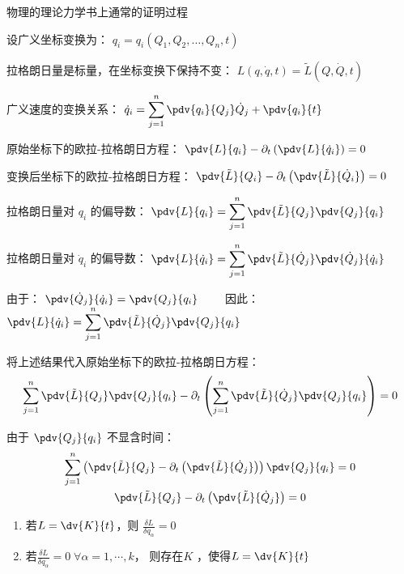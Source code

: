 \documentclass[12pt, a4paper, oneside, UTF8]{ctexbook}  %
\begin{document}
\begin{add}
    物理的理论力学书上通常的证明过程

    设广义坐标变换为：
    \(\displaystyle q_i = q_i(Q_1, Q_2, \dots, Q_n, t) \)
    
    拉格朗日量是标量，在坐标变换下保持不变：
    \(\displaystyle L(q, \dot{q}, t) = \tilde{L}(Q, \dot{Q}, t) \)
    
    广义速度的变换关系：
    \(\displaystyle \dot{q}_i = \sum_{j=1}^n \pdv{q_i}{Q_j} \dot{Q}_j + \pdv{q_i}{t} \)
    
    原始坐标下的欧拉-拉格朗日方程：
    \(\displaystyle \pdv{L}{q_i} - \partial_t \left( \pdv{L}{\dot{q}_i} \right) = 0 \)
    
    变换后坐标下的欧拉-拉格朗日方程：
    \(\displaystyle \pdv{\tilde{L}}{Q_i} - \partial_t \left( \pdv{\tilde{L}}{\dot{Q}_i} \right) = 0 \)
    
    拉格朗日量对 \( q_i \) 的偏导数：
    \(\displaystyle \pdv{L}{q_i} = \sum_{j=1}^n \pdv{\tilde{L}}{Q_j} \pdv{Q_j}{q_i} \)
    
    拉格朗日量对 \(\dot{q}_i\) 的偏导数：
    \(\displaystyle \pdv{L}{\dot{q}_i} = \sum_{j=1}^n \pdv{\tilde{L}}{\dot{Q}_j} \pdv{\dot{Q}_j}{\dot{q}_i} \)

    由于：
    \(\displaystyle \pdv{\dot{Q}_j}{\dot{q}_i} = \pdv{Q_j}{q_i}\qquad \)
    因此：
    \(\displaystyle \pdv{L}{\dot{q}_i} = \sum_{j=1}^n \pdv{\tilde{L}}{\dot{Q}_j} \pdv{Q_j}{q_i} \)

将上述结果代入原始坐标下的欧拉-拉格朗日方程：
\[
\sum_{j=1}^n \pdv{\tilde{L}}{Q_j} \pdv{Q_j}{q_i} - \partial_t \left( \sum_{j=1}^n \pdv{\tilde{L}}{\dot{Q}_j} \pdv{Q_j}{q_i} \right) = 0
\]

由于 \(\pdv{Q_j}{q_i}\) 不显含时间：
\begin{gather*}
\sum_{j=1}^n \left( \pdv{\tilde{L}}{Q_j} - \partial_t \left( \pdv{\tilde{L}}{\dot{Q}_j} \right) \right) \pdv{Q_j}{q_i} = 0
\\
\pdv{\tilde{L}}{Q_j} - \partial_t \left( \pdv{\tilde{L}}{\dot{Q}_j} \right) = 0
\end{gather*}
\end{add}
\begin{thm}
    \begin{enumerate}
        \item 若\(\displaystyle L=\dv{K}{t}\)，则
        \(\displaystyle \frac{\delta L}{\delta q_\alpha}=0\)
        \item 若\(\displaystyle \frac{\delta L}{\delta q_\alpha}=0\;\forall \alpha=1,\cdots,k\)，
        则存在\(K\) ，使得\(L = \dv{K}{t}\)
    \end{enumerate}
\end{thm}
\end{document}
